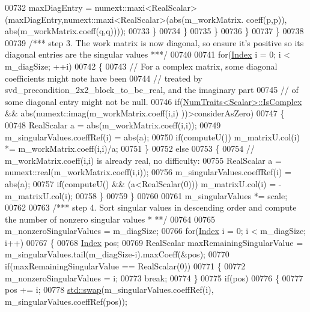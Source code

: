 \begin{DoxyCode}
00732             maxDiagEntry = numext::maxi<RealScalar>(maxDiagEntry,numext::maxi<RealScalar>(abs(m\_workMatrix.
      coeff(p,p)), abs(m\_workMatrix.coeff(q,q))));
00733           \}
00734         \}
00735       \}
00736     \}
00737   \}
00738 
00739   \textcolor{comment}{/*** step 3. The work matrix is now diagonal, so ensure it's positive so its diagonal entries are the
       singular values ***/}
00740 
00741   \textcolor{keywordflow}{for}(\hyperlink{group___s_v_d___module_a6229a37997eca1072b52cca5ee7a2bec}{Index} i = 0; i < m\_diagSize; ++i)
00742   \{
00743     \textcolor{comment}{// For a complex matrix, some diagonal coefficients might note have been}
00744     \textcolor{comment}{// treated by svd\_precondition\_2x2\_block\_to\_be\_real, and the imaginary part}
00745     \textcolor{comment}{// of some diagonal entry might not be null.}
00746     \textcolor{keywordflow}{if}(\hyperlink{group___core___module_struct_eigen_1_1_num_traits}{NumTraits<Scalar>::IsComplex} && abs(numext::imag(m\_workMatrix.coeff(i,i)
      ))>considerAsZero)
00747     \{
00748       RealScalar a = abs(m\_workMatrix.coeff(i,i));
00749       m\_singularValues.coeffRef(i) = abs(a);
00750       \textcolor{keywordflow}{if}(computeU()) m\_matrixU.col(i) *= m\_workMatrix.coeff(i,i)/a;
00751     \}
00752     \textcolor{keywordflow}{else}
00753     \{
00754       \textcolor{comment}{// m\_workMatrix.coeff(i,i) is already real, no difficulty:}
00755       RealScalar a = numext::real(m\_workMatrix.coeff(i,i));
00756       m\_singularValues.coeffRef(i) = abs(a);
00757       \textcolor{keywordflow}{if}(computeU() && (a<RealScalar(0))) m\_matrixU.col(i) = -m\_matrixU.col(i);
00758     \}
00759   \}
00760   
00761   m\_singularValues *= scale;
00762 
00763   \textcolor{comment}{/*** step 4. Sort singular values in descending order and compute the number of nonzero singular values *
      **/}
00764 
00765   m\_nonzeroSingularValues = m\_diagSize;
00766   \textcolor{keywordflow}{for}(\hyperlink{group___s_v_d___module_a6229a37997eca1072b52cca5ee7a2bec}{Index} i = 0; i < m\_diagSize; i++)
00767   \{
00768     \hyperlink{group___s_v_d___module_a6229a37997eca1072b52cca5ee7a2bec}{Index} pos;
00769     RealScalar maxRemainingSingularValue = m\_singularValues.tail(m\_diagSize-i).maxCoeff(&pos);
00770     \textcolor{keywordflow}{if}(maxRemainingSingularValue == RealScalar(0))
00771     \{
00772       m\_nonzeroSingularValues = i;
00773       \textcolor{keywordflow}{break};
00774     \}
00775     \textcolor{keywordflow}{if}(pos)
00776     \{
00777       pos += i;
00778       \hyperlink{endian_8c_a3ca5ecd34b04d6a243c054ac3a57f68d}{std::swap}(m\_singularValues.coeffRef(i), m\_singularValues.coeffRef(pos));

\end{DoxyCode}
